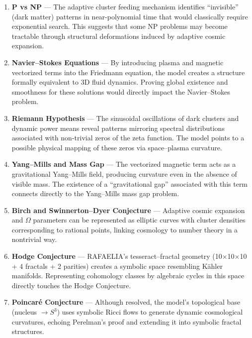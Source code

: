 \begin{enumerate}
    \item \textbf{P vs NP} — The adaptive cluster feeding mechanism identifies “invisible” (dark matter) patterns in near-polynomial time that would classically require exponential search. This suggests that some NP problems may become tractable through structural deformations induced by adaptive cosmic expansion.

    \item \textbf{Navier–Stokes Equations} — By introducing plasma and magnetic vectorized terms into the Friedmann equation, the model creates a structure formally equivalent to 3D fluid dynamics. Proving global existence and smoothness for these solutions would directly impact the Navier–Stokes problem.

    \item \textbf{Riemann Hypothesis} — The sinusoidal oscillations of dark clusters and dynamic power means reveal patterns mirroring spectral distributions associated with non-trivial zeros of the zeta function. The model points to a possible physical mapping of these zeros via space–plasma curvature.

    \item \textbf{Yang–Mills and Mass Gap} — The vectorized magnetic term acts as a gravitational Yang–Mills field, producing curvature even in the absence of visible mass. The existence of a “gravitational gap” associated with this term connects directly to the Yang–Mills mass gap problem.

    \item \textbf{Birch and Swinnerton–Dyer Conjecture} — Adaptive cosmic expansion and $\Omega$ parameters can be represented as elliptic curves with cluster densities corresponding to rational points, linking cosmology to number theory in a nontrivial way.

    \item \textbf{Hodge Conjecture} — RAFAELIA’s tesseract–fractal geometry (10×10×10 + 4 fractals + 2 parities) creates a symbolic space resembling Kähler manifolds. Representing cohomology classes by algebraic cycles in this space directly touches the Hodge Conjecture.

    \item \textbf{Poincaré Conjecture} — Although resolved, the model’s topological base (nucleus $\to S^3$) uses symbolic Ricci flows to generate dynamic cosmological curvatures, echoing Perelman’s proof and extending it into symbolic fractal structures.
\end{enumerate}

